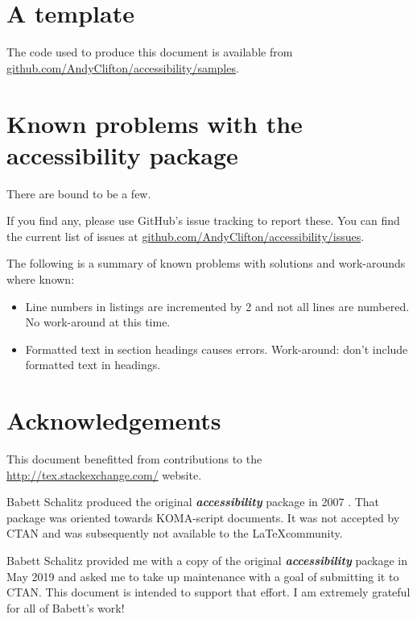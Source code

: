 \documentclass[10pt,onecolumn]{article}
\newcommand{\packagename}[1]{\textbf{\emph{#1}}}
\begin{document}
\section{A template}
The code used to produce this document is available from \href{https://github.com/AndyClifton/accessibility/samples}{github.com/AndyClifton/accessibility/samples}.

\section{Known problems with the accessibility package}
There are bound to be a few.

If you find any, please use GitHub's issue tracking to report these. You can find the current list of issues at \href{https://github.com/AndyClifton/accessibility/issues}{github.com/AndyClifton/accessibility/issues}.

The following is a summary of known problems with solutions and work-arounds where known:
\begin{itemize}
\item Line numbers in listings are incremented by 2 and not all lines are numbered. No work-around at this time.
\item Formatted text in section headings causes errors. Work-around: don't include formatted text in headings.
\end{itemize}

\section*{Acknowledgements}
This document benefitted from contributions to the \href{http://tex.stackexchange.com/}{http://tex.stackexchange.com/} website.

Babett Schalitz produced the original \packagename{accessibility} package in 2007 \citep{schalitz2007}. That package was oriented towards KOMA-script documents. It was not accepted by CTAN and was subsequently not available to the \LaTeX community.

Babett Schalitz provided me with a copy of the original \packagename{accessibility} package in May 2019 and asked me to take up maintenance with a goal of submitting it to CTAN. This document is intended to support that effort. I am extremely grateful for all of Babett's work!

\cleardoublepage

\label{sec:Bib}

\end{document}
